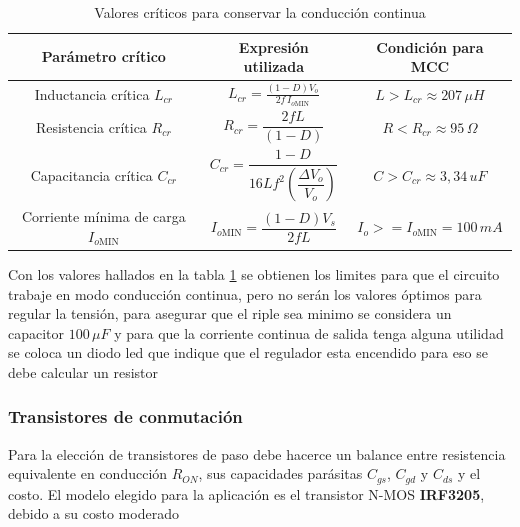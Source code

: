 \documentclass[]{article}
\begin{document}
	\renewcommand{\arraystretch}{1.5}
	\begin{table}[H]
		\centering
		\caption{Valores críticos para conservar la conducción continua}
		\renewcommand{\arraystretch}{1.5}
		\begin{tabular}{|c|c|c|}
			\hline
			\textbf{Parámetro crítico} & \textbf{Expresión utilizada} & \textbf{Condición para MCC} \\
			\hline
			
			Inductancia crítica \(L_{cr}\) &
			\(
			L_{cr}= \frac{(1-D)V_o}{2f\,I_{o\text{MIN}}}
			\)
			&
			\(
			L > L_{cr} \approx 207 \, \mu H
			\)
			\\
			
			\hline
			
			Resistencia crítica \(R_{cr}\) &
			\(
			R_{cr}=\dfrac{2fL}{(1-D)}
			\)
			&
			\(
			R < R_{cr} \approx 95\, \Omega
			\)
			\\
			
			\hline
			
			Capacitancia crítica \(C_{cr}\) &
			\(
			C_{cr}=\dfrac{1-D}{16Lf^2\left(\dfrac{\Delta V_o}{V_o}\right)}
			\)
			&
			\(
			C > C_{cr} \approx 3,34 \, uF
			\)
			\\
			
			\hline
			
			Corriente mínima de carga \(I_{o\text{MIN}}\) &
			\(
			I_{o\text{MIN}}=\dfrac{(1-D)V_s}{2fL}
			\)
			&
			\(
			I_o >= I_{o\text{MIN}} = 100 \, mA
			\)
			\\
			
			\hline
			
		\end{tabular}
		\label{tab:criticos_mcc}
	\end{table}
	
	
	Con los valores hallados en la tabla \ref{tab:criticos_mcc} se obtienen los limites para que el circuito trabaje en modo conducción continua, pero no serán los valores óptimos para regular la tensión, para asegurar que el riple sea minimo se considera un capacitor $100 \, \mu F$ y para que la corriente continua de salida tenga alguna utilidad se coloca un diodo led que indique que el regulador esta encendido para eso se debe calcular un resistor 
	
	\subsubsection{Transistores de conmutación}
	Para la elección de transistores de paso debe hacerce un balance entre resistencia equivalente en conducción $R_{ON}$, sus capacidades parásitas $C_{gs}$, $C_{gd}$ y $C_{ds}$ y el costo.
	El modelo elegido para la aplicación es el transistor N-MOS \textbf{IRF3205}, debido a su costo moderado
	
\end{document}
